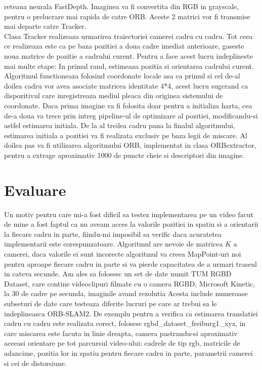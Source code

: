 \documentclass[12pt,a4paper]{report}
\begin{document}
reteaua neurala FastDepth. Imaginea va fi convertita din RGB in grayscale, pentru o 
prelucrare mai rapida de catre ORB. Aceste 2 matrici vor fi transmise mai departe 
catre Tracker. \\
Clasa Tracker realizeaza urmarirea traiectoriei camerei cadru cu cadru. Tot ceea ce realizeaza 
este ca pe baza pozitiei a doua cadre imediat anterioare, gaseste noua matrice de pozitie a
cadrului curent. Pentru a face acest lucru indeplineste mai multe etape: In primul rand, estimeaza
pozitia si orientarea cadrului curent. Algoritmul functioneaza folosind coordonate locale asa ca 
primul si cel de-al doilea cadru vor avea asociate matricea identitate 4*4, acest lucru sugerand
ca dispozitivul care inregistreaza mediul pleaca din originea sistemului de coordonate. Daca prima
imagine va fi folosita doar pentru a initializa harta, cea de-a doua va trece prin intreg 
pipeline-ul de optimizare al pozitiei, modificandu-si astfel estimarea initiala. De la al treilea
cadru pana la finalul algoritmului, estimarea initiala a pozitiei va fi realizata exclusiv pe baza
legii de miscare. Al doilea pas va fi utilizarea algoritmului ORB, implementat in clasa ORBextractor,
pentru a extrage aproximativ 1000 de puncte cheie si descriptori din imagine.



  








\chapter{Evaluare}

Un motiv pentru care mi-a fost dificil
sa testez implementarea pe un video facut de mine a fost faptul ca nu aveam acces la valorile
pozitiei in spatiu si a orientarii la fiecare cadru in parte, fiindu-mi imposibil sa verific 
daca acuratetea implementarii este corespunzatoare. Algoritmul are nevoie de matricea \(K\) a   
camerei, daca valorile ei sunt incorecte algoritmul va creea MapPoint-uri noi pentru aproape
fiecare cadru in parte si va pierde capacitatea de a urmari traseul in cateva secunde. 
Am ales sa folosesc un set de date numit TUM RGBD Dataset, care contine videoclipuri filmate 
cu o camera RGBD, Microsoft Kinetic, la 30 de cadre pe secunda, imaginile avand rezolutia Acesta include numeroase 
subseturi de date care testeaza diferite lucruri pe care ar trebui sa le indeplineasca 
ORB-SLAM2. De exemplu pentru a verifica ca estimarea translatiei cadru cu cadru este realizata 
corect, folosesc rgbd\_dataset\_freiburg1\_xyz, in care miscarea este 
facuta in linie dreapta, camera pastrandu-si aproximativ aceeasi orientare pe tot parcursul video-ului: cadrele de tip rgb, matricile de adancime, pozitia lor in spatiu 
pentru fiecare cadru in parte, parametrii camerei si cei de distorsiune.     
\end{document}
